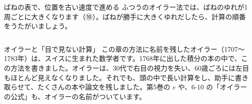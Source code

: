 \begin{tsumazuki}{ばねの表で、位置を古い速度で進める}
ふつうのオイラー法では、ばねのゆれが1周ごとに大きくなります（⑩）。ばねが勝手に大きくゆれだしたら、計算の順番をうたがいましょう。
\end{tsumazuki}

\begin{column}{オイラーと「目で見ない計算」}
この章の方法に名前を残したオイラー（1707〜1783年）は、スイスに生まれた数学者です。1768年に出した積分の本の中で、この方法を書きました。オイラーは、30代で右目の視力を失い、60歳ごろには左目もほとんど見えなくなりました。それでも、頭の中で長い計算をし、助手に書き取らせて、たくさんの本や論文を残しました。第5巻の $e$ や、6-10 の「オイラーの公式」も、オイラーの名前がついています。
\end{column}

